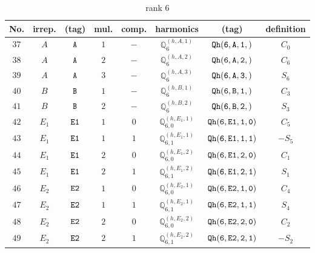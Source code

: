 \documentclass[fleqn,8pt]{jsarticle}
\begin{document}
\begin{table}[ht!]
\begin{center}
\caption{rank 6}
\renewcommand{\arraystretch}{1.3}
\begin{tabular}{cccccccc} \hline \hline
No. & irrep. & (tag) & mul. & comp. & harmonics & (tag) & definition \\ \hline
$ 37 $ & $ A $ & $ {\tt A} $ & $ 1 $ & $ - $ & $ \mathbb{Q}_{6}^{(h,A,1)} $ & $ {\tt Qh(6,A,1,)} $ & $ C_{0} $ \\
$ 38 $ & $ A $ & $ {\tt A} $ & $ 2 $ & $ - $ & $ \mathbb{Q}_{6}^{(h,A,2)} $ & $ {\tt Qh(6,A,2,)} $ & $ C_{6} $ \\
$ 39 $ & $ A $ & $ {\tt A} $ & $ 3 $ & $ - $ & $ \mathbb{Q}_{6}^{(h,A,3)} $ & $ {\tt Qh(6,A,3,)} $ & $ S_{6} $ \\
$ 40 $ & $ B $ & $ {\tt B} $ & $ 1 $ & $ - $ & $ \mathbb{Q}_{6}^{(h,B,1)} $ & $ {\tt Qh(6,B,1,)} $ & $ C_{3} $ \\
$ 41 $ & $ B $ & $ {\tt B} $ & $ 2 $ & $ - $ & $ \mathbb{Q}_{6}^{(h,B,2)} $ & $ {\tt Qh(6,B,2,)} $ & $ S_{3} $ \\
$ 42 $ & $ E_{1} $ & $ {\tt E1} $ & $ 1 $ & $ 0 $ & $ \mathbb{Q}_{6,0}^{(h,E_{1},1)} $ & $ {\tt Qh(6,E1,1,0)} $ & $ C_{5} $ \\
$ 43 $ & $ E_{1} $ & $ {\tt E1} $ & $ 1 $ & $ 1 $ & $ \mathbb{Q}_{6,1}^{(h,E_{1},1)} $ & $ {\tt Qh(6,E1,1,1)} $ & $ - S_{5} $ \\
$ 44 $ & $ E_{1} $ & $ {\tt E1} $ & $ 2 $ & $ 0 $ & $ \mathbb{Q}_{6,0}^{(h,E_{1},2)} $ & $ {\tt Qh(6,E1,2,0)} $ & $ C_{1} $ \\
$ 45 $ & $ E_{1} $ & $ {\tt E1} $ & $ 2 $ & $ 1 $ & $ \mathbb{Q}_{6,1}^{(h,E_{1},2)} $ & $ {\tt Qh(6,E1,2,1)} $ & $ S_{1} $ \\
$ 46 $ & $ E_{2} $ & $ {\tt E2} $ & $ 1 $ & $ 0 $ & $ \mathbb{Q}_{6,0}^{(h,E_{2},1)} $ & $ {\tt Qh(6,E2,1,0)} $ & $ C_{4} $ \\
$ 47 $ & $ E_{2} $ & $ {\tt E2} $ & $ 1 $ & $ 1 $ & $ \mathbb{Q}_{6,1}^{(h,E_{2},1)} $ & $ {\tt Qh(6,E2,1,1)} $ & $ S_{4} $ \\
$ 48 $ & $ E_{2} $ & $ {\tt E2} $ & $ 2 $ & $ 0 $ & $ \mathbb{Q}_{6,0}^{(h,E_{2},2)} $ & $ {\tt Qh(6,E2,2,0)} $ & $ C_{2} $ \\
$ 49 $ & $ E_{2} $ & $ {\tt E2} $ & $ 2 $ & $ 1 $ & $ \mathbb{Q}_{6,1}^{(h,E_{2},2)} $ & $ {\tt Qh(6,E2,2,1)} $ & $ - S_{2} $ \\
 \hline \hline
\end{tabular}
\end{center}
\end{table}
\end{document}
